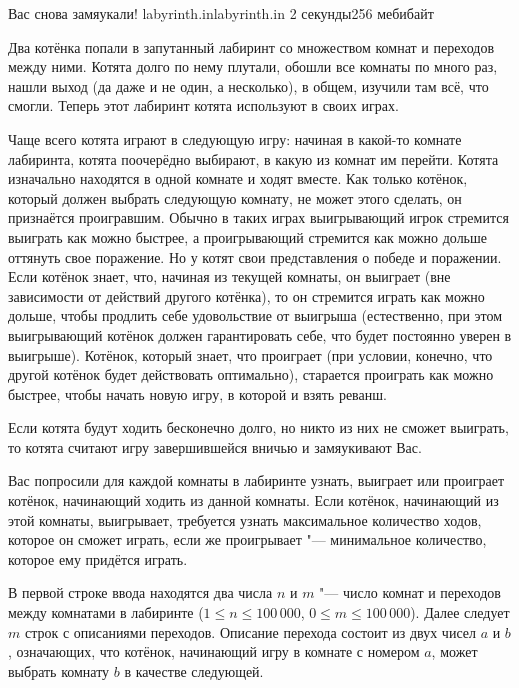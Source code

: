 
\begin{problem}{Вас снова замяукали!}
{labyrinth.in}{labyrinth.in}
{2 секунды}{256 мебибайт}

Два котёнка попали в запутанный лабиринт со множеством комнат и переходов
между ними. Котята долго по нему плутали, обошли все комнаты по много раз,
нашли выход (да даже и не один, а несколько), в общем, изучили там всё, что
смогли. Теперь этот лабиринт котята используют в своих играх.

Чаще всего котята играют в следующую игру: начиная в какой-то комнате
лабиринта, котята поочерёдно выбирают, в какую из комнат им перейти.
Котята изначально находятся в одной комнате и ходят вместе.
Как только котёнок, который должен выбрать следующую комнату, не может
этого сделать, он признаётся проигравшим. Обычно в таких играх выигрывающий
игрок стремится выиграть как можно быстрее, а проигрывающий стремится как
можно дольше оттянуть свое поражение. Но у котят свои представления о
победе и поражении. Если котёнок знает, что, начиная из текущей комнаты,
он выиграет (вне зависимости от действий другого котёнка), то он стремится
играть как можно дольше, чтобы продлить себе удовольствие от выигрыша
(естественно, при этом выигрывающий котёнок должен гарантировать себе, что
будет постоянно уверен в выигрыше).
Котёнок, который знает, что проиграет (при условии, конечно, что другой
котёнок будет действовать оптимально), старается проиграть как можно
быстрее, чтобы начать новую игру, в которой и взять реванш.

Если котята будут ходить бесконечно долго, но никто из них не сможет выиграть,
то котята считают игру завершившейся вничью и замяукивают Вас.

Вас попросили для каждой комнаты в лабиринте узнать, выиграет или проиграет
котёнок, начинающий ходить из данной комнаты. Если котёнок, начинающий из
этой комнаты, выигрывает, требуется узнать максимальное количество ходов,
которое он сможет играть, если же проигрывает "--- минимальное количество,
которое ему придётся играть.

\InputFile

В первой строке ввода находятся два числа $n$ и $m$ "--- число комнат и
переходов между комнатами в лабиринте ($1 \le n \le 100\,000$,
$0 \le m \le 100\,000$). Далее следует $m$ строк с описаниями переходов.
Описание перехода состоит из
двух чисел $a$ и $b$, означающих, что котёнок, начинающий игру в комнате
с номером $a$, может выбрать комнату $b$ в качестве следующей.


\end{problem}
